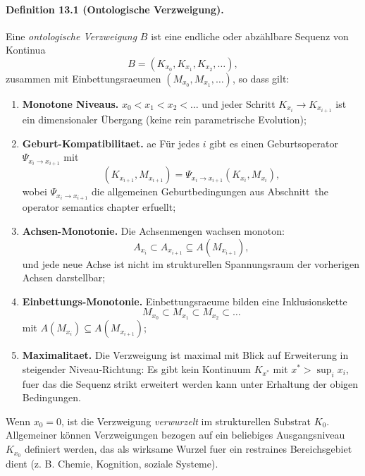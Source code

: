 \paragraph{Definition 13.1 (Ontologische Verzweigung).}
Eine \emph{ontologische Verzweigung} \(B\) ist eine endliche oder abzählbare
Sequenz von Kontinua
\[
  B = (K_{x_0}, K_{x_1}, K_{x_2}, \dots),
\]
zusammen mit Einbettungsraeumen \((M_{x_0}, M_{x_1}, \dots)\), so dass gilt:
\begin{enumerate}
  \item \textbf{Monotone Niveaus.}\quad
        \(x_0 < x_1 < x_2 < \dots\) und jeder Schritt
        \(K_{x_i} \to K_{x_{i+1}}\) ist ein dimensionaler Übergang
        (keine rein parametrische Evolution);
  \item \textbf{Geburt-Kompatibilitaet.}\quad
ae
        Für jedes \(i\) gibt es einen Geburtsoperator
        \(\Psi_{x_i\to x_{i+1}}\) mit
        \[
          (K_{x_{i+1}}, M_{x_{i+1}}) =
            \Psi_{x_i\to x_{i+1}}(K_{x_i}, M_{x_i}),
        \]
        wobei \(\Psi_{x_i\to x_{i+1}}\) die allgemeinen Geburtbedingungen aus
        Abschnitt~the operator semantics chapter erfuellt;
  \item \textbf{Achsen-Monotonie.}\quad
        Die Achsenmengen wachsen monoton:
        \[
          A_{x_i} \subset A_{x_{i+1}}
          \subseteq A(M_{x_{i+1}}),
        \]
        und jede neue Achse ist nicht im strukturellen Spannungsraum der
        vorherigen Achsen darstellbar;
  \item \textbf{Einbettungs-Monotonie.}\quad
        Einbettungsraeume bilden eine Inklusionskette
        \[
          M_{x_0} \subset M_{x_1} \subset M_{x_2} \subset \dots
        \]
        mit \(A(M_{x_i}) \subseteq A(M_{x_{i+1}})\);
  \item \textbf{Maximalitaet.}\quad
        Die Verzweigung ist maximal mit Blick auf Erweiterung in steigender
        Niveau-Richtung: Es gibt kein Kontinuum \(K_{x^{\ast}}\) mit
        \(x^{\ast} > \sup_i x_i\), fuer das die Sequenz strikt erweitert werden
        kann unter Erhaltung der obigen Bedingungen.
\end{enumerate}

Wenn \(x_0 = 0\), ist die Verzweigung \emph{verwurzelt} im strukturellen
Substrat \(K_0\). Allgemeiner können Verzweigungen bezogen auf ein beliebiges
Ausgangsniveau \(K_{x_0}\) definiert werden, das als wirksame Wurzel fuer ein
restraines Bereichsgebiet dient (z. B. Chemie, Kognition, soziale Systeme).

